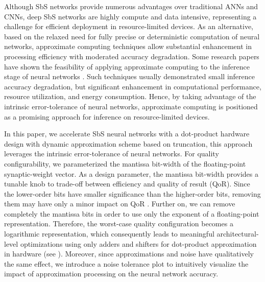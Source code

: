 Although SbS networks provide numerous advantages over traditional ANNs and CNNs, deep SbS networks are highly compute and data intensive, representing a challenge for efficient deployment in resource-limited devices. %
As an alternative, based on the relaxed need for fully precise or deterministic computation of neural networks, approximate computing techniques allow substantial enhancement in processing efficiency with moderated accuracy degradation. Some research papers have shown the feasibility of applying approximate computing to the inference stage of neural networks \cite{lotrivc2012applicability, sarwar2016multiplier, mrazek2016design, du2014leveraging}. Such techniques usually demonstrated small inference accuracy degradation, but significant enhancement in computational performance, resource utilization, and energy consumption. Hence, by taking advantage of the intrinsic error-tolerance of neural networks, approximate computing is positioned as a promising approach for inference on resource-limited devices.

In this paper, we accelerate SbS neural networks with a dot-product hardware design with dynamic approximation scheme based on truncation, this approach leverages the intrinsic error-tolerance of neural networks. For quality configurability, we parameterized the mantissa bit-width of the floating-point synaptic-weight vector. As a design parameter, the mantissa bit-width provides a tunable knob to trade-off between efficiency and quality of result (QoR)\cite{park2009dynamic, han2013approximate}. Since the lower-order bits have smaller significance than the higher-order bits, removing them may have only a minor impact on QoR \cite{gupta2011impact, mittal2016survey}. Further on, we can remove completely the mantissa bits in order to use only the exponent of a floating-point representation. Therefore, the worst-case quality configuration becomes a logarithmic representation, which consequently leads to meaningful architectural-level optimizations using only adders and shifters for dot-product approximation in hardware (see ). Moreover, since approximations and noise have qualitatively the same effect\cite{venkataramani2015approximate}, we introduce a noise tolerance plot to intuitively visualize the impact of approximation processing on the neural network accuracy.

